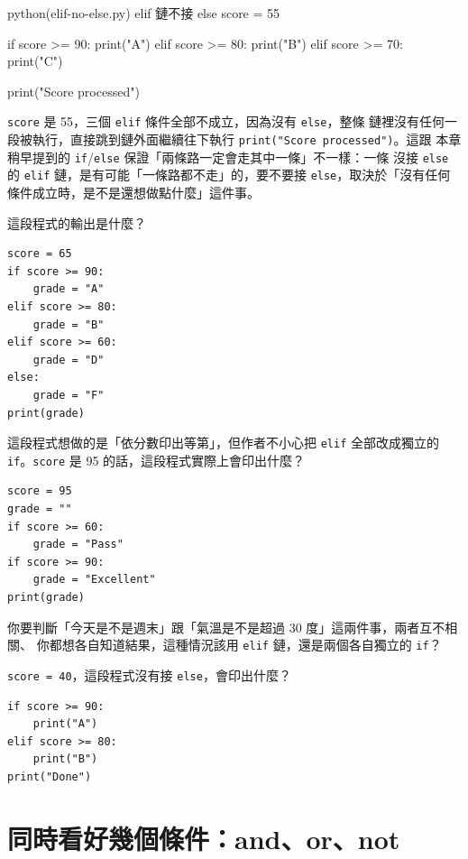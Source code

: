 \begin{example}{python}{(elif-no-else.py) elif 鏈不接 else}
score = 55

if score >= 90:
    print("A")
elif score >= 80:
    print("B")
elif score >= 70:
    print("C")

print("Score processed")
\end{example}


\texttt{score} 是 55，三個 \texttt{elif} 條件全部不成立，因為沒有 \texttt{else}，整條
鏈裡沒有任何一段被執行，直接跳到鏈外面繼續往下執行 \texttt{print("Score processed")}。這跟
本章稍早提到的 \texttt{if}/\texttt{else} 保證「兩條路一定會走其中一條」不一樣：一條
沒接 \texttt{else} 的 \texttt{elif} 鏈，是有可能「一條路都不走」的，要不要接
\texttt{else}，取決於「沒有任何條件成立時，是不是還想做點什麼」這件事。

\begin{drills}[label=drills:elif-chain]
\item 這段程式的輸出是什麼？
\begin{verbatim}
score = 65
if score >= 90:
    grade = "A"
elif score >= 80:
    grade = "B"
elif score >= 60:
    grade = "D"
else:
    grade = "F"
print(grade)
\end{verbatim}
\item 這段程式想做的是「依分數印出等第」，但作者不小心把 \texttt{elif} 全部改成獨立的
\texttt{if}。\texttt{score} 是 95 的話，這段程式實際上會印出什麼？
\begin{verbatim}
score = 95
grade = ""
if score >= 60:
    grade = "Pass"
if score >= 90:
    grade = "Excellent"
print(grade)
\end{verbatim}
\item 你要判斷「今天是不是週末」跟「氣溫是不是超過 30 度」這兩件事，兩者互不相關、
你都想各自知道結果，這種情況該用 \texttt{elif} 鏈，還是兩個各自獨立的 \texttt{if}？
\item \texttt{score = 40}，這段程式沒有接 \texttt{else}，會印出什麼？
\begin{verbatim}
if score >= 90:
    print("A")
elif score >= 80:
    print("B")
print("Done")
\end{verbatim}
\end{drills}

\section{同時看好幾個條件：and、or、not}
\label{sec:logical-operators}

